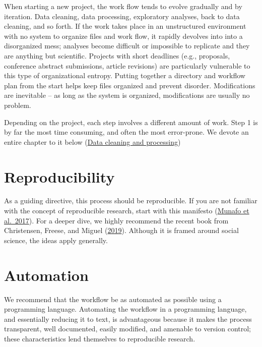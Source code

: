 \documentclass[]{book}
\begin{document}
When starting a new project, the work flow tends to evolve gradually and by iteration. Data cleaning, data processing, exploratory analyses, back to data cleaning, and so forth. If the work takes place in an unstructured environment with no system to organize files and work flow, it rapidly devolves into into a disorganized mess; analyses become difficult or impossible to replicate and they are anything but scientific. Projects with short deadlines (e.g., proposals, conference abstract submissions, article revisions) are particularly vulnerable to this type of organizational entropy. Putting together a directory and workflow plan from the start helps keep files organized and prevent disorder. Modifications are inevitable -- as long as the system is organized, modifications are usually no problem.

Depending on the project, each step involves a different amount of work. Step 1 is by far the most time consuming, and often the most error-prone. We devote an entire chapter to it below (\protect\hyperlink{datacleaning}{Data cleaning and processing})

\hypertarget{reproducibility}{%
\section{Reproducibility}\label{reproducibility}}

As a guiding directive, this process should be reproducible. If you are not familiar with the concept of reproducible research, start with this manifesto (\href{https://www.nature.com/articles/s41562-016-0021}{Munafo et al.~2017}). For a deeper dive, we highly recommend the recent book from Christensen, Freese, and Miguel (\href{https://www.ucpress.edu/book/9780520296954/transparent-and-reproducible-social-science-research}{2019}). Although it is framed around social science, the ideas apply generally.

\hypertarget{automation}{%
\section{Automation}\label{automation}}

We recommend that the workflow be as automated as possible using a programming language. Automating the workflow in a programming language, and essentially reducing it to text, is advantageous because it makes the process transparent, well documented, easily modified, and amenable to version control; these characteristics lend themselves to reproducible research.
\end{document}
